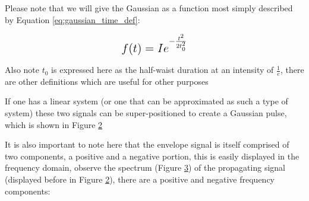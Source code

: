 \documentclass[colorlinks,11pt,a4paper,normalphoto,withhyper,ragged2e]{altareport}
\begin{document}
	Please note that we will give the Gaussian as a function most simply described by Equation \ref{eq:gaussian_time_def}:
	
	\begin{equation} \label{eq:gaussian_time_def}
		\mathlarger{ \mathlarger{ f(t) = I e^{-\frac{t^2}{2t^2_0}} } }
	\end{equation}
	
	{\footnotesize Also note $t_0$ is expressed here as the half-waist duration at an intensity of $\frac{1}{e}$, there are other definitions which are useful for other purposes} \linebreak
	
	If one has a linear system (or one that can be approximated as such a type of system) these two signals can be super-positioned to create a Gaussian pulse, which is shown in Figure \ref{fig:gaussian_demo} \linebreak
	
	\begin{figure}[h]
		\centering
		\scalebox{0.85}{}
		\caption{}
		\label{fig:gaussian_decon}
	\end{figure}	
	
	\vspace{5mm}
	
	\begin{figure}[h]
		\centering
		\scalebox{0.85}{}
		\caption{}
		\label{fig:gaussian_demo}
	\end{figure}	
	
	\pagebreak
	
	It is also important to note here that the envelope signal is itself comprised of two components, a positive and a negative portion, this is easily displayed in the frequency domain, observe the spectrum (Figure \ref{fig:gaussian_spectrum}) of the propagating signal (displayed before in Figure \ref{fig:gaussian_demo}), there are a positive and negative frequency components: \linebreak
	
	\begin{figure}[h]
		\centering
		\scalebox{0.85}{}
		\caption{}
		\label{fig:gaussian_spectrum}
	\end{figure}
	
\end{document}
